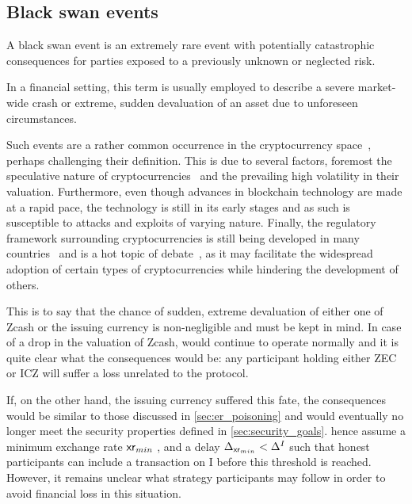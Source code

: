 \subsection{Black swan events}
\label{sec:black_swan}
A black swan event is an extremely rare event with potentially catastrophic consequences for parties exposed to a previously unknown or neglected risk.

In a financial setting, this term is usually employed to describe a severe market-wide crash or extreme, sudden devaluation of an asset due to unforeseen circumstances.

Such events are a rather common occurrence in the cryptocurrency space~\cite{fry2016negative,sophonex_2019blackswan}, perhaps challenging their definition.
This is due to several factors, foremost the speculative nature of cryptocurrencies~\cite{cheah2015speculative} and the prevailing high volatility in their valuation.
Furthermore, even though advances in blockchain technology are made at a rapid pace, the technology is still in its early stages and as such is susceptible to attacks and exploits of varying nature.
Finally, the regulatory framework surrounding cryptocurrencies is still being developed in many countries~\cite{loc2018regulation} and is a hot topic of debate~\cite{yeung2019regulation}, as it may facilitate the widespread adoption of certain types of cryptocurrencies while hindering the development of others.

This is to say that the chance of sudden, extreme devaluation of either one of Zcash or the issuing currency is non-negligible and must be kept in mind.
In case of a drop in the valuation of Zcash, \zclaim would continue to operate normally and it is quite clear what the consequences would be: any participant holding either ZEC or ICZ will suffer a loss unrelated to the protocol.

If, on the other hand, the issuing currency suffered this fate, the consequences would be similar to those discussed in \cref{sec:er_poisoning} and \zclaim would eventually no longer meet the security properties defined in \cref{sec:security_goals}.
\textcite{zamyatin2019xclaim} hence assume a minimum exchange rate $\mathsf{xr}_{min}$ , and a delay $\Delta_{\mathsf{xr}_{min}} < \Delta^I$ such that honest participants can include a transaction on I before this threshold is reached.
However, it remains unclear what strategy participants may follow in order to avoid financial loss in this situation.


